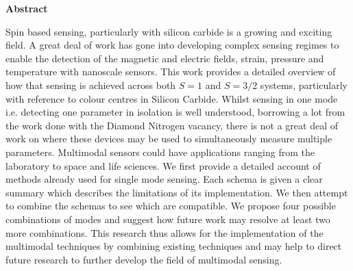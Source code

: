 \vspace*{\fill}
\begin{center}
\textrm{\bfseries\Huge Abstract}%
\end{center}%
Spin based sensing, particularly with silicon carbide is a growing and exciting field. A great deal of work has gone into developing complex sensing regimes to enable the detection of the magnetic and electric fields, strain, pressure and temperature with nanoscale sensors. 
This work provides a detailed overview of how that sensing is achieved across both $S=1$ and $S=3/2$ systems, particularly with reference to colour centres in Silicon Carbide. 
Whilst sensing in one mode i.e. detecting one parameter in isolation is well understood, borrowing a lot from the work done with the Diamond Nitrogen vacancy, there is not a great deal of work on where these devices may be used to simultaneously measure multiple parameters. 
Multimodal sensors could have applications ranging from the laboratory to space and life sciences. We first provide a detailed account of methods already used for single mode sensing. Each schema is given a clear summary which describes the limitations of its implementation. We then attempt to combine the schemas to see which are compatible.
%
We propose four possible combinations of modes and suggest how future work may resolve at least two more combinations. This research thus allows for the implementation of the multimodal techniques by combining existing techniques and may help to direct future research to further develop the field of multimodal sensing. 
\vspace{1em}

\vspace*{\fill}
\newpage
\newpage
